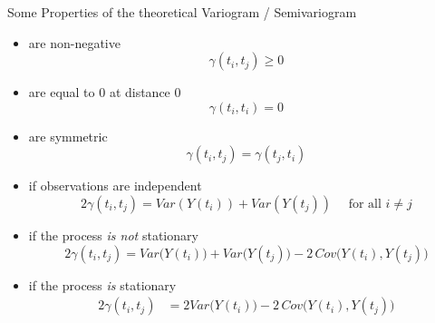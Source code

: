 \documentclass[11pt,ignorenonframetext,]{beamer}
\providecommand{\tightlist}{%
  \setlength{\itemsep}{0pt}\setlength{\parskip}{0pt}}
\begin{document}
\begin{frame}[t]{Some Properties of the theoretical Variogram /
Semivariogram}
\protect\hypertarget{some-properties-of-the-theoretical-variogram-semivariogram}{}

\vspace{-2mm}

\begin{itemize}
\tightlist
\item
  are non-negative \footnotesize \[\gamma(t_i, t_j) \geq 0\] \normalsize
\end{itemize}

\pause

\vspace{2mm}

\begin{itemize}
\tightlist
\item
  are equal to 0 at distance 0 \footnotesize \[\gamma(t_i, t_i) = 0\]
  \normalsize
\end{itemize}

\pause

\vspace{2mm}

\begin{itemize}
\tightlist
\item
  are symmetric \footnotesize \[\gamma(t_i, t_j) = \gamma(t_j, t_i)\]
  \normalsize
\end{itemize}

\pause

\vspace{2mm}

\begin{itemize}
\tightlist
\item
  if observations are independent
  \footnotesize \[2\gamma(t_i, t_j) = Var(Y(t_i)) + Var(Y(t_j)) \quad \text{ for all } i \ne j\]
  \normalsize
\end{itemize}

\pause

\vspace{2mm}

\begin{itemize}
\tightlist
\item
  if the process \emph{is not} stationary \footnotesize
  \[2\gamma(t_i, t_j) = Var\big(Y(t_i)\big) + Var\big(Y(t_j)\big) - 2 \, Cov\big(Y(t_i),Y(t_j)\big)\]
\end{itemize}

\pause

\vspace{2mm}

\begin{itemize}
\tightlist
\item
  if the process \emph{is} stationary \footnotesize \[\begin{aligned}
  2\gamma(t_i, t_j) 
  &= 2Var\big(Y(t_i)\big) - 2 \, Cov\big(Y(t_i),Y(t_j)\big)
  \end{aligned}\]
\end{itemize}

\end{frame}
\end{document}
